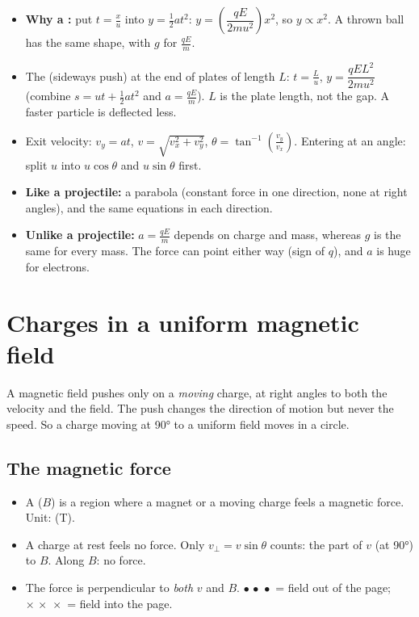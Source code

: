 \begin{itemize}
  \item \textbf{Why a :} put $t = \frac{x}{u}$ into
        $y = \frac{1}{2}at^2$: $y = \left(\dfrac{qE}{2mu^2}\right)x^2$, so
        $y \propto x^2$. A thrown ball has the same shape, with $g$ for $\frac{qE}{m}$.
  \item The  (sideways push) at the end of plates of length $L$:
        $t = \frac{L}{u}$, $y = \dfrac{qEL^2}{2mu^2}$ (combine
        $s = ut + \frac{1}{2}at^2$ and $a = \frac{qE}{m}$). $L$ is the plate
        length, not the gap. A faster particle is deflected less.
  \item Exit velocity: $v_y = at$, $v = \sqrt{v_x^2 + v_y^2}$,
        $\theta = \tan^{-1}\!\left(\frac{v_y}{v_x}\right)$. Entering at an angle:
        split $u$ into $u\cos\theta$ and $u\sin\theta$ first.
  \item \textbf{Like a projectile:} a parabola (constant force in one direction,
        none at right angles), and the same equations in each direction.
  \item \textbf{Unlike a projectile:} $a = \frac{qE}{m}$ depends on charge and mass,
        whereas $g$ is the same for every mass. The force can point either way
        (sign of $q$), and $a$ is huge for electrons.
\end{itemize}

\section{Charges in a uniform magnetic field}\label{ch1:sec:bfield}

\begin{bigidea}
A magnetic field pushes only on a \emph{moving} charge, at right angles to both
the velocity and the field. The push changes the direction of motion but never
the speed. So a charge moving at \ang{90} to a uniform field moves in a circle.
\end{bigidea}

\subsection{The magnetic force}
\begin{itemize}
  \item A  ($B$) is a region where a magnet or a moving
        charge feels a magnetic force. Unit:  (T).
  \item A charge at rest feels no force. Only $v_\perp = v\sin\theta$ counts: the
        part of $v$  (at \ang{90}) to $B$. Along $B$: no force.
  \item The force is perpendicular to \emph{both} $v$ and $B$.
        $\bullet\,\bullet\,\bullet$ = field out of the page;
        $\times\,\times\,\times$ = field into the page.
\end{itemize}

